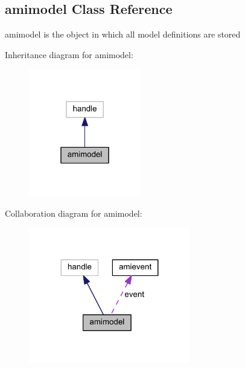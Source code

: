 \hypertarget{classamimodel}{}\subsection{amimodel Class Reference}
\label{classamimodel}


amimodel is the object in which all model definitions are stored  




Inheritance diagram for amimodel\+:\nopagebreak
\begin{figure}[H]
\begin{center}
\leavevmode
\includegraphics[width=139pt]{classamimodel__inherit__graph}
\end{center}
\end{figure}


Collaboration diagram for amimodel\+:\nopagebreak
\begin{figure}[H]
\begin{center}
\leavevmode
\includegraphics[width=200pt]{classamimodel__coll__graph}
\end{center}
\end{figure}
